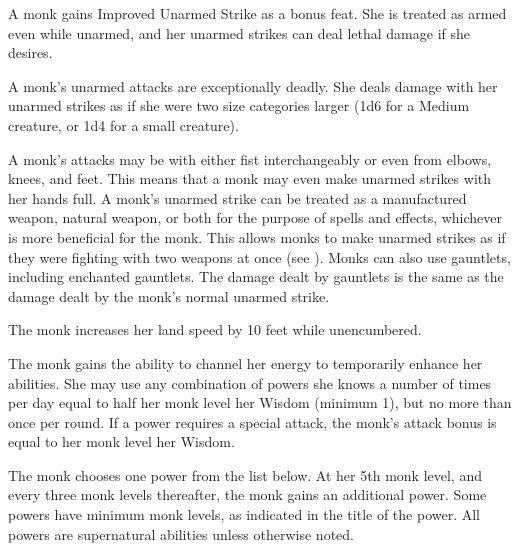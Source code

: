 \begin{comment}  %
 \cfnl{\Ki Ward (Ex)}\label{Mnk:Ki Ward (Ex)} When unarmored and unencumbered, a monk gains a \plus1 armor bonus to AC at 2nd level. This bonus increases by 1 for every two monk levels thereafter (\plus2 at 4th, \plus3 at 6th, etc.).

\par The monk loses this bonus when she is
immobilized or helpless, when she wears any armor, when she carries a shield, or when she carries a medium or heavy load.
\end{comment}

 A monk gains Improved Unarmed Strike as a bonus feat. She is treated as armed even while unarmed, and her unarmed strikes can deal lethal damage if she desires.

 A monk's unarmed attacks are exceptionally deadly. She deals damage with her unarmed strikes as if she were two size categories larger (1d6 for a Medium creature, or 1d4 for a small creature).

A monk's attacks may be with either fist interchangeably or even from elbows, knees, and feet. This means that a monk may even make unarmed strikes with her hands full. A monk's unarmed strike can be treated as a manufactured weapon, natural weapon, or both for the purpose of spells and effects, whichever is more beneficial for the monk. This allows monks to make unarmed strikes as if they were fighting with two weapons at once (see ). Monks can also use gauntlets, including enchanted gauntlets. The damage dealt by gauntlets is the same as the damage dealt by the monk's normal unarmed strike.

 The monk increases her land speed by 10 feet while unencumbered.

 The monk gains the ability to channel her \ki energy to temporarily enhance her abilities. She may use any combination of \ki powers she knows a number of times per day equal to half her monk level \add her Wisdom (minimum 1), but no more than once per round. If a \ki power requires a special attack, the monk's attack bonus is equal to her monk level \add her Wisdom.

The monk chooses one \ki power from the list below. At her 5th monk level, and every three monk levels thereafter, the monk gains an additional \ki power. Some \ki powers have minimum monk levels, as indicated in the title of the power. All \ki powers are supernatural abilities unless otherwise noted.

